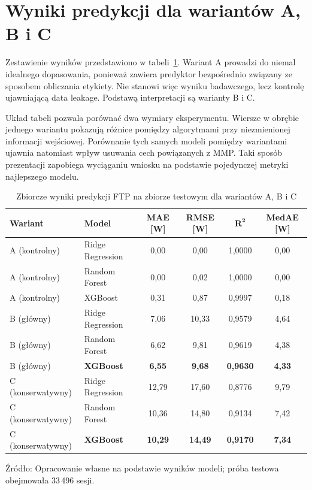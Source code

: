 \FloatBarrier
\section{Wyniki predykcji dla wariantów A, B i C}

Zestawienie wyników przedstawiono w tabeli~\ref{tab:wyniki_modele_wszystkie}. Wariant A prowadzi do niemal idealnego dopasowania, ponieważ zawiera predyktor bezpośrednio związany ze sposobem obliczania etykiety. Nie stanowi więc wyniku badawczego, lecz kontrolę ujawniającą data leakage. Podstawą interpretacji są warianty B i C.

Układ tabeli pozwala porównać dwa wymiary eksperymentu. Wiersze w obrębie jednego wariantu pokazują różnice pomiędzy algorytmami przy niezmienionej informacji wejściowej. Porównanie tych samych modeli pomiędzy wariantami ujawnia natomiast wpływ usuwania cech powiązanych z MMP. Taki sposób prezentacji zapobiega wyciąganiu wniosku na podstawie pojedynczej metryki najlepszego modelu.

\begin{table}[htbp]
\centering
\caption{Zbiorcze wyniki predykcji FTP na zbiorze testowym dla wariantów A, B i C}
\label{tab:wyniki_modele_wszystkie}
\small
\begin{tabular}{|l|l|c|c|c|c|}
\hline
\textbf{Wariant} & \textbf{Model} & \textbf{MAE [W]} & \textbf{RMSE [W]} & \textbf{$\mathbf{R^2}$} & \textbf{MedAE [W]} \\ \hline
A (kontrolny) & Ridge Regression & 0{,}00 & 0{,}00 & 1{,}0000 & 0{,}00 \\ \hline
A (kontrolny) & Random Forest & 0{,}00 & 0{,}02 & 1{,}0000 & 0{,}00 \\ \hline
A (kontrolny) & XGBoost & 0{,}31 & 0{,}87 & 0{,}9997 & 0{,}18 \\ \hline
B (główny) & Ridge Regression & 7{,}06 & 10{,}33 & 0{,}9579 & 4{,}64 \\ \hline
B (główny) & Random Forest & 6{,}62 & 9{,}81 & 0{,}9619 & 4{,}38 \\ \hline
B (główny) & \textbf{XGBoost} & \textbf{6{,}55} & \textbf{9{,}68} & \textbf{0{,}9630} & \textbf{4{,}33} \\ \hline
C (konserwatywny) & Ridge Regression & 12{,}79 & 17{,}60 & 0{,}8776 & 9{,}79 \\ \hline
C (konserwatywny) & Random Forest & 10{,}36 & 14{,}80 & 0{,}9134 & 7{,}42 \\ \hline
C (konserwatywny) & \textbf{XGBoost} & \textbf{10{,}29} & \textbf{14{,}49} & \textbf{0{,}9170} & \textbf{7{,}34} \\ \hline
\end{tabular}
\par\smallskip
\raggedright\footnotesize Źródło: Opracowanie własne na podstawie wyników modeli; próba testowa obejmowała 33\,496 sesji.
\end{table}


